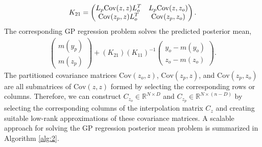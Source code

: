 \documentclass[article,ij4uq]{ij4uq}              %
\begin{document}
\begin{align}
    K_{21}=\begin{pmatrix}L_{p}{\rm{Cov}}(z,z)L_{o}^{T} & L_{p}{\rm{Cov}}(z,z_{o})\\{\rm{Cov}}(z_{p},z)L_{o}^{T} & {\rm{Cov}}(z_{p},z_{o})\end{pmatrix}. \label{eq25}
\end{align}
The corresponding GP regression problem solves the predicted posterior mean,
\begin{align}
    \begin{pmatrix}m(y_{p})\\m(z_{p})\end{pmatrix}+(K_{21})(K_{11})^{-1}\begin{pmatrix}y_{o}-m(y_{o})\\z_{o}-m(z_{o})\end{pmatrix}.\label{eq26}
\end{align}
The partitioned covariance matrices $\mathrm{Cov}(z_{o},z)$, $\mathrm{Cov}(z_{p},z)$, and $\mathrm{Cov}(z_{p},z_{o})$ are all submatrices of $\mathrm{Cov}(z,z)$ formed by selecting the corresponding rows or columns. Therefore, we can construct $C_{z_{o}}\in\mathbb{R}^{N\times D}$ and $C_{z_{p}}\in\mathbb{R}^{N\times (n-D)}$ by selecting the corresponding columns of the interpolation matrix $C_{z}$ and creating suitable low-rank approximations of these covariance matrices. A scalable approach for solving the GP regression posterior mean problem is summarized in Algorithm \ref{alg:2}.
\end{document}
